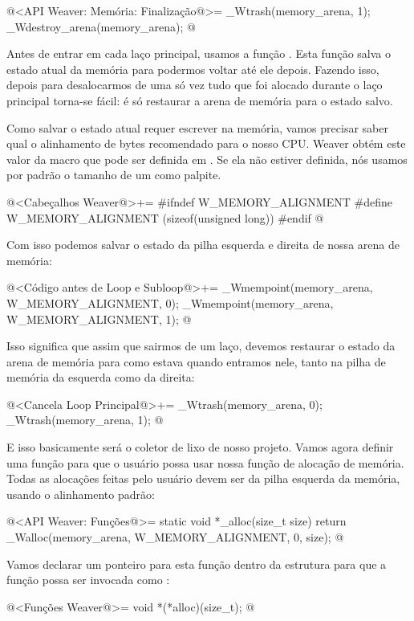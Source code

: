\iniciocodigo
@<API Weaver: Memória: Finalização@>=
_Wtrash(memory_arena, 1);
_Wdestroy_arena(memory_arena);
@
\fimcodigo

Antes de entrar em cada laço principal, usamos a
função . Esta função salva o estado atual da
memória para podermos voltar até ele depois. Fazendo isso, depois para
desalocarmos de uma só vez tudo que foi alocado durante o laço
principal torna-se fácil: é só restaurar a arena de memória para o
estado salvo.

Como salvar o estado atual requer escrever na memória, vamos precisar
saber qual o alinhamento de bytes recomendado para o nosso CPU. Weaver
obtém este valor da macro  que pode
ser definida em . Se ela não estiver definida,
nós usamos por padrão o tamanho de um  como
palpite.

\iniciocodigo
@<Cabeçalhos Weaver@>+=
#ifndef W_MEMORY_ALIGNMENT
#define W_MEMORY_ALIGNMENT (sizeof(unsigned long))
#endif
@
\fimcodigo

Com isso podemos salvar o estado da pilha esquerda e direita de nossa
arena de memória:

\iniciocodigo
@<Código antes de Loop e Subloop@>+=
_Wmempoint(memory_arena, W_MEMORY_ALIGNMENT, 0);
_Wmempoint(memory_arena, W_MEMORY_ALIGNMENT, 1);
@
\fimcodigo

Isso significa que assim que sairmos de um laço, devemos restaurar o
estado da arena de memória para como estava quando entramos nele,
tanto na pilha de memória da esquerda como da direita:

\iniciocodigo
@<Cancela Loop Principal@>+=
_Wtrash(memory_arena, 0);
_Wtrash(memory_arena, 1);
@
\fimcodigo

E isso basicamente será o coletor de lixo de nosso projeto. Vamos
agora definir uma função para que o usuário possa usar nossa função de
alocação de memória. Todas as alocações feitas pelo usuário devem ser
da pilha esquerda da memória, usando o alinhamento padrão:

\iniciocodigo
@<API Weaver: Funções@>=
static void *_alloc(size_t size){
  return _Walloc(memory_arena, W_MEMORY_ALIGNMENT, 0, size);
}
@
\fimcodigo

Vamos declarar um ponteiro para esta função dentro da
estrutura  para que a função possa ser invocada
como :

\iniciocodigo
@<Funções Weaver@>=
void *(*alloc)(size_t);
@
\fimcodigo

